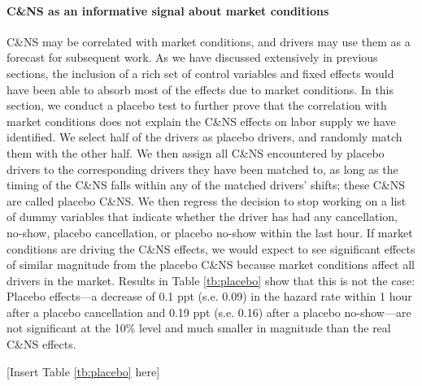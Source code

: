 \documentclass[reviewmode]{restat}
\begin{document}
\paragraph{C\&NS as an informative signal about market conditions} C\&NS may be correlated with market conditions,
and drivers may use them as a forecast for subsequent work. As we have discussed extensively in previous sections,
the inclusion of a rich set of control variables and fixed effects would have been able to absorb most of the 
effects due to market conditions. In this section, we conduct a placebo test to further prove that the correlation 
with market conditions does not explain the C\&NS effects on labor supply we have identified. We select half 
of the drivers as placebo drivers, and randomly match them with the other half. We then assign all C\&NS 
encountered by placebo drivers to the corresponding drivers they have been matched to, as long as the timing 
of the C\&NS falls within any of the matched drivers' shifts; these C\&NS are called placebo C\&NS. 
We then regress the decision to stop working on a list of dummy variables that indicate whether the driver
has had any cancellation, no-show, placebo cancellation, or placebo no-show within the last hour. 
If market conditions are driving the C\&NS effects, we would expect to see significant effects of similar
magnitude from the placebo C\&NS because market conditions affect all drivers in the market. 
Results in Table \ref{tb:placebo} show that this is not the case: Placebo effects---a decrease of
0.1 ppt (s.e. 0.09) in the hazard rate within 1 hour after a placebo cancellation and 0.19 ppt (s.e. 0.16) 
after a placebo no-show---are not significant at the 10\% level and much smaller in magnitude than the real
C\&NS effects.

\begin{center}
    [Insert Table \ref{tb:placebo} here]
\end{center}


\end{document}
